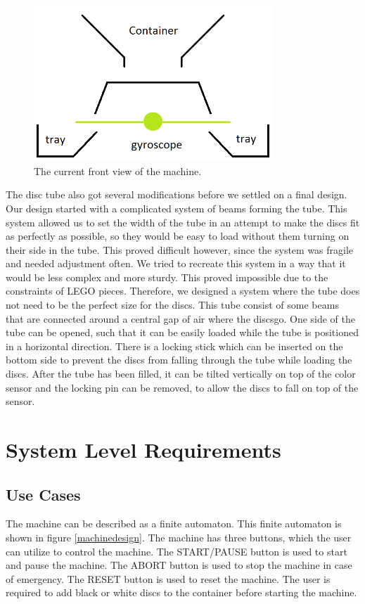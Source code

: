 \documentclass[a4paper,oneside,11pt]{article}
\begin{document}
\begin{figure}[H]
	\centering
	\includegraphics[width=90mm]{frontnew}
	\caption{\label{front}The current front view of the machine.}
\end{figure}

The disc tube also got several modifications before we settled on a final design. Our design started with a complicated system of beams forming the tube. This system allowed us to set the width of the tube in an attempt to make the discs fit as perfectly as possible, so they would be easy to load without them turning on their side in the tube. This proved difficult however, since the system was fragile and needed adjustment often. We tried to recreate this system in a way that it would be less complex and more sturdy. This proved impossible due to the constraints of LEGO pieces. Therefore, we designed a system where the tube does not need to be the perfect size for the discs. This tube consist of some beams that are connected around a central gap of air where the discsgo. One side of the tube can be opened, such that it can be easily loaded while the tube is positioned in a horizontal direction. There is a locking stick which can be inserted on the bottom side to prevent the discs from falling through the tube while loading the discs. After the tube has been filled, it can be tilted vertically on top of the color sensor and the locking pin can be removed, to allow the discs to fall on top of the sensor.

\section{System Level Requirements}
\subsection{Use Cases}
The machine can be described as a finite automaton. This finite automaton is shown in figure \ref{machinedesign}.
The machine has three buttons, which the user can utilize to control the machine. The START/PAUSE button is used to start and pause the machine. The ABORT button is used to stop the machine in case of emergency. The RESET button is used to reset the machine. The user is required to add black or white discs to the container before starting the machine.
\end{document}
